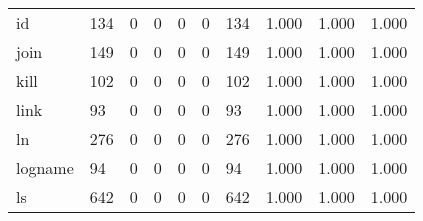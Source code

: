 \begin{longtable}{lp{1.3cm}p{1.3cm}p{1.3cm}p{1.3cm}p{1.3cm}p{1.3cm}p{1.3cm}p{1.3cm}p{1.3cm}}
id        &                    134 &                                  0 &                                 0 &                                0 &                                 0 &                             134 &                                1.000 &                                  1.000 &                                1.000 \\
join      &                    149 &                                  0 &                                 0 &                                0 &                                 0 &                             149 &                                1.000 &                                  1.000 &                                1.000 \\
kill      &                    102 &                                  0 &                                 0 &                                0 &                                 0 &                             102 &                                1.000 &                                  1.000 &                                1.000 \\
link      &                     93 &                                  0 &                                 0 &                                0 &                                 0 &                              93 &                                1.000 &                                  1.000 &                                1.000 \\
ln        &                    276 &                                  0 &                                 0 &                                0 &                                 0 &                             276 &                                1.000 &                                  1.000 &                                1.000 \\
logname   &                     94 &                                  0 &                                 0 &                                0 &                                 0 &                              94 &                                1.000 &                                  1.000 &                                1.000 \\
ls        &                    642 &                                  0 &                                 0 &                                0 &                                 0 &                             642 &                                1.000 &                                  1.000 &                                1.000 \\

\end{longtable}
